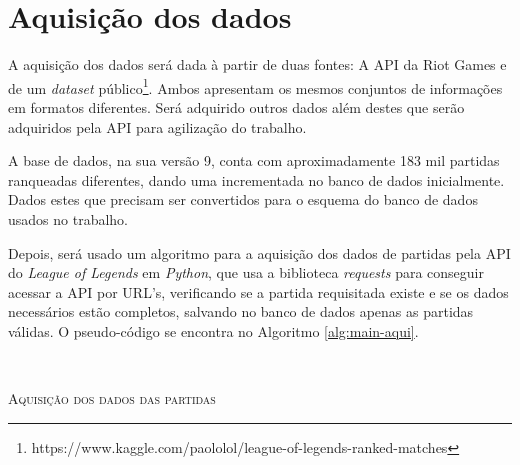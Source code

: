 \section{Aquisição dos dados}
A aquisição dos dados será dada à partir de duas fontes: A API da Riot Games e de um \textit{dataset} público\footnote{https://www.kaggle.com/paololol/league-of-legends-ranked-matches}. Ambos apresentam os mesmos conjuntos de informações em formatos diferentes. Será adquirido outros dados além destes que serão adquiridos pela API para agilização do trabalho.

A base de dados, na sua versão 9, conta com aproximadamente 183 mil partidas ranqueadas diferentes, dando uma incrementada no banco de dados inicialmente. Dados estes que precisam ser convertidos para o esquema do banco de dados usados no trabalho.

Depois, será usado um algoritmo para a aquisição dos dados de partidas pela API do \textit{League of Legends} em \textit{Python}, que usa a biblioteca \textit{requests} para conseguir acessar a API por URL's, verificando se a partida requisitada existe e se os dados necessários estão completos, salvando no banco de dados apenas as partidas válidas. O pseudo-código se encontra no Algoritmo \ref{alg:main-aqui}.

\


\begin{algorithm}[H]
   \SetAlgoLined
   \label{alg:main-aqui}
   \caption{\textsc{Aquisição dos dados das partidas}}
 \end{algorithm}

